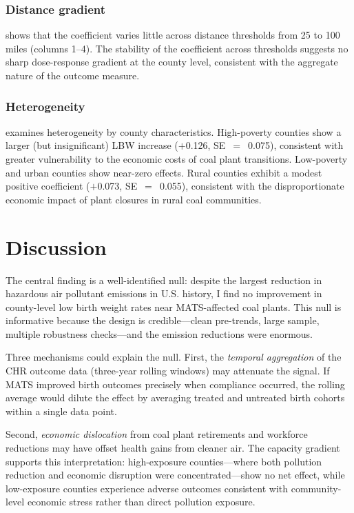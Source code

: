 \documentclass[12pt]{article}
\begin{document}


\subsubsection*{Distance gradient}  shows that the coefficient varies little across distance thresholds from 25 to 100 miles (columns 1--4). The stability of the coefficient across thresholds suggests no sharp dose-response gradient at the county level, consistent with the aggregate nature of the outcome measure.



\subsubsection*{Heterogeneity}  examines heterogeneity by county characteristics. High-poverty counties show a larger (but insignificant) LBW increase ($+$0.126, SE~$=$~0.075), consistent with greater vulnerability to the economic costs of coal plant transitions. Low-poverty and urban counties show near-zero effects. Rural counties exhibit a modest positive coefficient ($+$0.073, SE~$=$~0.055), consistent with the disproportionate economic impact of plant closures in rural coal communities.




\section{Discussion}

The central finding is a well-identified null: despite the largest reduction in hazardous air pollutant emissions in U.S. history, I find no improvement in county-level low birth weight rates near MATS-affected coal plants. This null is informative because the design is credible---clean pre-trends, large sample, multiple robustness checks---and the emission reductions were enormous.

Three mechanisms could explain the null. First, the \textit{temporal aggregation} of the CHR outcome data (three-year rolling windows) may attenuate the signal. If MATS improved birth outcomes precisely when compliance occurred, the rolling average would dilute the effect by averaging treated and untreated birth cohorts within a single data point.

Second, \textit{economic dislocation} from coal plant retirements and workforce reductions may have offset health gains from cleaner air. The capacity gradient supports this interpretation: high-exposure counties---where both pollution reduction and economic disruption were concentrated---show no net effect, while low-exposure counties experience adverse outcomes consistent with community-level economic stress rather than direct pollution exposure.
\end{document}
